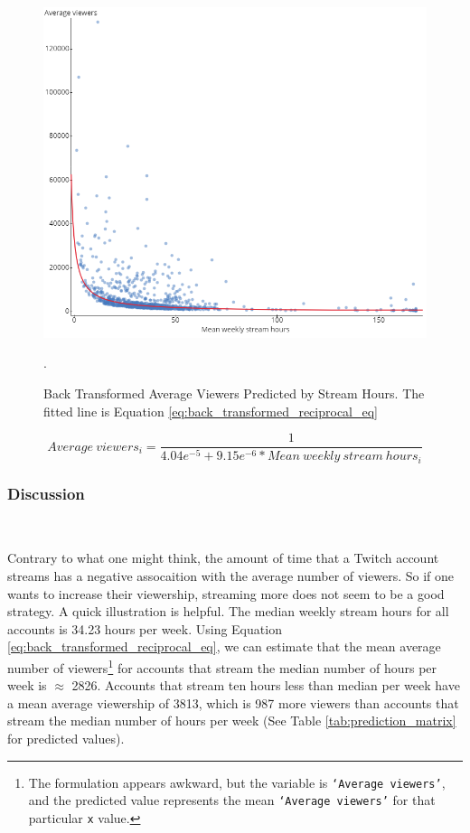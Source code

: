 \documentclass[12pt]{article}
\begin{document}
\begin{figure}[H]
  \centering %
  \includegraphics[width=0.8\linewidth]{../StatCrunch_Results/reciprocal/scatter_plot_reverse_transformed}
  \captionsetup{justification=centering, singlelinecheck=false, margin=2cm}
  \caption[Back Transformed Average Viewers Predicted by Stream Hours]{Back Transformed Average Viewers Predicted by Stream Hours. The fitted line is Equation \ref{eq:back_transformed_reciprocal_eq}}.
  \label{fig:transformed_reciprocal_scatter}
\end{figure}

\begin{equation}
Average\ viewers_{i} = \dfrac{1}{4.04e^{-5} + 9.15e^{-6} \ast Mean\ weekly\ stream\ hours_{i}} \label{eq:back_transformed_reciprocal_eq}
\end{equation}

\subsubsection{Discussion}\

Contrary to what one might think, the amount of time that a Twitch account streams has a negative assocaition with the average number of viewers. So if one wants to increase their viewership, streaming more does not seem to be a good strategy. A quick illustration is helpful. The median weekly stream hours for all accounts is 34.23 hours per week. Using Equation \ref{eq:back_transformed_reciprocal_eq}, we can estimate that the mean average number of viewers\footnote{The formulation appears awkward, but the variable is \texttt{`Average viewers'}, and the predicted value represents the mean \texttt{`Average viewers'} for that particular \texttt{x} value.} for accounts that stream the median number of hours per week is $\approx$ 2826. Accounts that stream ten hours less than median per week have a mean average viewership of 3813, which is 987 more viewers than accounts that stream the median number of hours per week (See Table \ref{tab:prediction_matrix} for predicted values).
\end{document}
